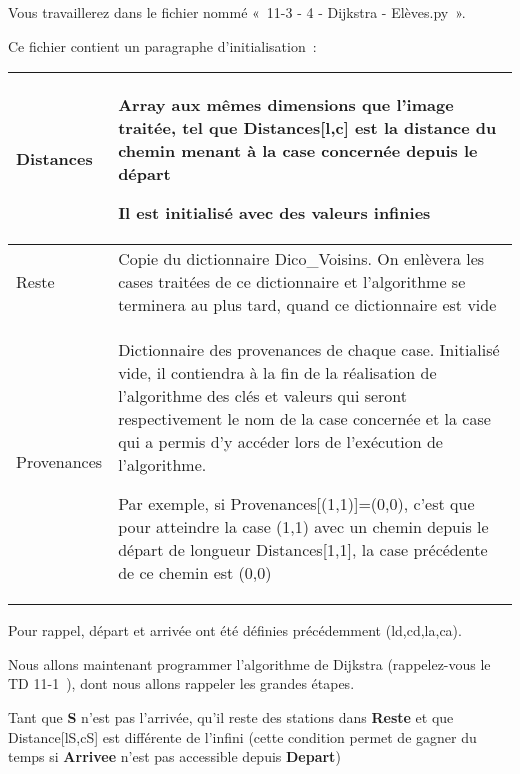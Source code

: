 \documentclass[
]{article}
\begin{document}
Vous travaillerez dans le fichier nommé «~11-3 - 4 - Dijkstra -
Elèves.py~».

Ce fichier contient un paragraphe d'initialisation~:

\begin{longtable}[]{@{}ll@{}}
\toprule
\begin{minipage}[b]{0.47\columnwidth}\raggedright
Distances\strut
\end{minipage} & \begin{minipage}[b]{0.47\columnwidth}\raggedright
Array aux mêmes dimensions que l'image traitée, tel que
Distances{[}l,c{]} est la distance du chemin menant à la case concernée
depuis le départ

Il est initialisé avec des valeurs infinies\strut
\end{minipage}\tabularnewline
\midrule
\endhead
Reste & Copie du dictionnaire Dico\_Voisins. On enlèvera les cases
traitées de ce dictionnaire et l'algorithme se terminera au plus tard,
quand ce dictionnaire est vide\tabularnewline
\begin{minipage}[t]{0.47\columnwidth}\raggedright
Provenances\strut
\end{minipage} & \begin{minipage}[t]{0.47\columnwidth}\raggedright
Dictionnaire des provenances de chaque case. Initialisé vide, il
contiendra à la fin de la réalisation de l'algorithme des clés et
valeurs qui seront respectivement le nom de la case concernée et la case
qui a permis d'y accéder lors de l'exécution de l'algorithme.

Par exemple, si Provenances{[}(1,1){]}=(0,0), c'est que pour atteindre
la case (1,1) avec un chemin depuis le départ de longueur
Distances{[}1,1{]}, la case précédente de ce chemin est (0,0)\strut
\end{minipage}\tabularnewline
\bottomrule
\end{longtable}

Pour rappel, départ et arrivée ont été définies précédemment
(ld,cd,la,ca).

Nous allons maintenant programmer l'algorithme de Dijkstra
(rappelez-vous le TD 11-1~), dont nous allons rappeler les grandes
étapes.

Tant que \textbf{S} n'est pas l'arrivée, qu'il reste des stations dans
\textbf{Reste} et que Distance{[}lS,cS{]} est différente de l'infini
(cette condition permet de gagner du temps si \textbf{Arrivee} n'est pas
accessible depuis \textbf{Depart})
\end{document}
